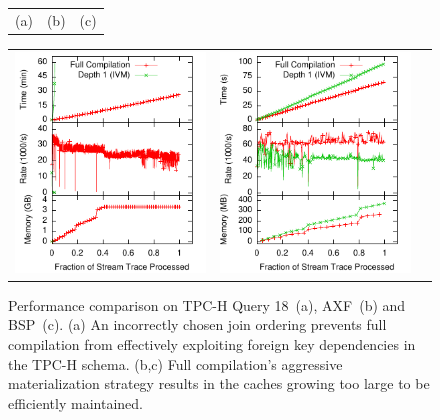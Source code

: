 \begin{figure}
\begin{center}
\begin{minipage}{\textwidth}
\begin{center}
\begin{tabular}{ccc}
(a) & (b) & (c)
\end{tabular}
\caption{Performance comparison on TPC-H Query 18~(a), AXF~(b) and BSP~(c). (a) An incorrectly chosen join ordering prevents full compilation from effectively exploiting foreign key dependencies in the TPC-H schema. (b,c) Full compilation's aggressive materialization strategy results in the caches growing too large to be efficiently maintained.}
\label{fig:experiments:tpch18}
\label{fig:experiments:axfinder}
\label{fig:experiments:brokerspread}
\end{center}
\end{minipage}

\vspace*{0.1in}

\begin{minipage}{\textwidth}
\begin{center}
\begin{tabular}{ccc}
\includegraphics[width=\figurewidth]{../graphs/graphs/unified_5gig_tpch3.pdf} &
\includegraphics[width=\figurewidth]{../graphs/graphs/unified_5gig_tpch11.pdf} &

\end{tabular}
\end{center}
\end{minipage}
\end{center}
\end{figure}
